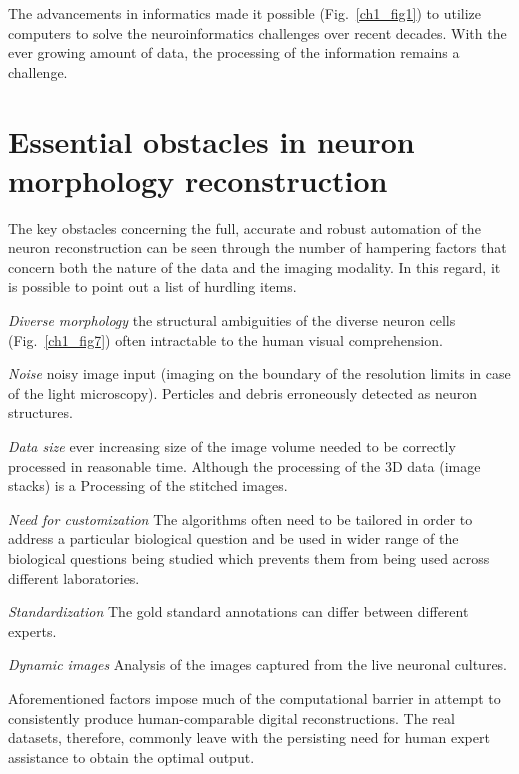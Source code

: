 The advancements in informatics made it possible (Fig.~\ref{ch1_fig1}) to utilize computers to solve the neuroinformatics challenges over recent decades. With the ever growing amount of data, the processing of the information remains a challenge.   

\section{Essential obstacles in neuron morphology reconstruction}
The key obstacles concerning the full, accurate and robust automation of the neuron reconstruction \cite{meijering2010neuron,donohue2011automated,acciai2016automated} can be seen through the number of hampering factors that concern both the nature of the data and the imaging modality. In this regard, it is possible to point out a list of hurdling items.

\textit{Diverse morphology} the structural ambiguities of the diverse neuron cells (Fig.~\ref{ch1_fig7}) often intractable to the human visual comprehension.

\textit{Noise} noisy image input (imaging on the boundary of the resolution limits in case of the light microscopy). Perticles and debris erroneously detected as neuron structures.

\textit{Data size} ever increasing size of the image volume needed to be correctly processed in reasonable time. Although the processing of the 3D data (image stacks) is a  Processing of the stitched images.

\textit{Need for customization} The algorithms often need to be tailored in order to address a particular biological question and be used in wider range of the biological questions being studied which prevents them from being used across different laboratories.

\textit{Standardization} The gold standard annotations can differ between different experts.

\textit{Dynamic images} Analysis of the images captured from the live neuronal cultures.


Aforementioned factors impose much of the computational barrier \cite{peng2011proof,svoboda2011past} in attempt to consistently produce human-comparable digital reconstructions. The real datasets, therefore, commonly leave with the persisting need for human expert assistance to obtain the optimal output. 

